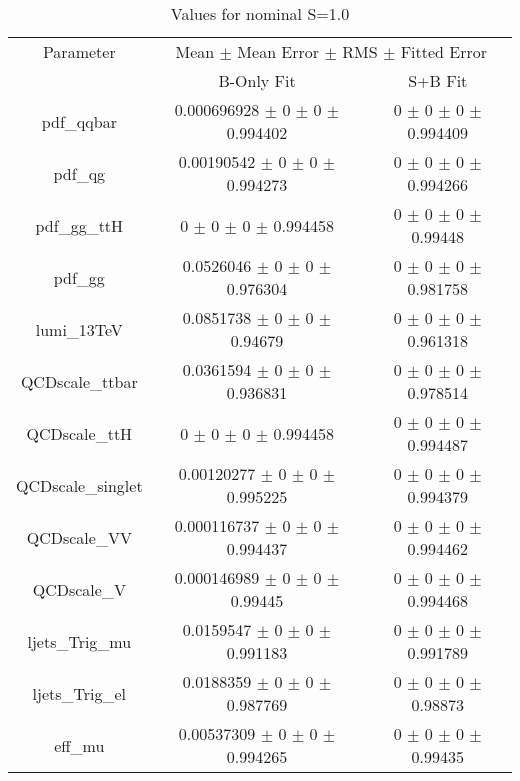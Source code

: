 \begin{table}
\centering
\caption{Values for nominal S=1.0}
\begin{tabular}{ccc}
\toprule
Parameter & \multicolumn{2}{c}{Mean $\pm$ Mean Error $\pm$ RMS $\pm$ Fitted Error}\\
 & B-Only Fit & S+B Fit\\
\midrule
pdf\_qqbar & \num{0.000696928} $\pm$ \num{0} $\pm$ \num{0} $\pm$ \num{0.994402} & \num{0} $\pm$ \num{0} $\pm$ \num{0} $\pm$ \num{0.994409}\\
pdf\_qg & \num{0.00190542} $\pm$ \num{0} $\pm$ \num{0} $\pm$ \num{0.994273} & \num{0} $\pm$ \num{0} $\pm$ \num{0} $\pm$ \num{0.994266}\\
pdf\_gg\_ttH & \num{0} $\pm$ \num{0} $\pm$ \num{0} $\pm$ \num{0.994458} & \num{0} $\pm$ \num{0} $\pm$ \num{0} $\pm$ \num{0.99448}\\
pdf\_gg & \num{0.0526046} $\pm$ \num{0} $\pm$ \num{0} $\pm$ \num{0.976304} & \num{0} $\pm$ \num{0} $\pm$ \num{0} $\pm$ \num{0.981758}\\
lumi\_13TeV & \num{0.0851738} $\pm$ \num{0} $\pm$ \num{0} $\pm$ \num{0.94679} & \num{0} $\pm$ \num{0} $\pm$ \num{0} $\pm$ \num{0.961318}\\
QCDscale\_ttbar & \num{0.0361594} $\pm$ \num{0} $\pm$ \num{0} $\pm$ \num{0.936831} & \num{0} $\pm$ \num{0} $\pm$ \num{0} $\pm$ \num{0.978514}\\
QCDscale\_ttH & \num{0} $\pm$ \num{0} $\pm$ \num{0} $\pm$ \num{0.994458} & \num{0} $\pm$ \num{0} $\pm$ \num{0} $\pm$ \num{0.994487}\\
QCDscale\_singlet & \num{0.00120277} $\pm$ \num{0} $\pm$ \num{0} $\pm$ \num{0.995225} & \num{0} $\pm$ \num{0} $\pm$ \num{0} $\pm$ \num{0.994379}\\
QCDscale\_VV & \num{0.000116737} $\pm$ \num{0} $\pm$ \num{0} $\pm$ \num{0.994437} & \num{0} $\pm$ \num{0} $\pm$ \num{0} $\pm$ \num{0.994462}\\
QCDscale\_V & \num{0.000146989} $\pm$ \num{0} $\pm$ \num{0} $\pm$ \num{0.99445} & \num{0} $\pm$ \num{0} $\pm$ \num{0} $\pm$ \num{0.994468}\\
ljets\_Trig\_mu & \num{0.0159547} $\pm$ \num{0} $\pm$ \num{0} $\pm$ \num{0.991183} & \num{0} $\pm$ \num{0} $\pm$ \num{0} $\pm$ \num{0.991789}\\
ljets\_Trig\_el & \num{0.0188359} $\pm$ \num{0} $\pm$ \num{0} $\pm$ \num{0.987769} & \num{0} $\pm$ \num{0} $\pm$ \num{0} $\pm$ \num{0.98873}\\
eff\_mu & \num{0.00537309} $\pm$ \num{0} $\pm$ \num{0} $\pm$ \num{0.994265} & \num{0} $\pm$ \num{0} $\pm$ \num{0} $\pm$ \num{0.99435}\\

\end{tabular}
\end{table}
